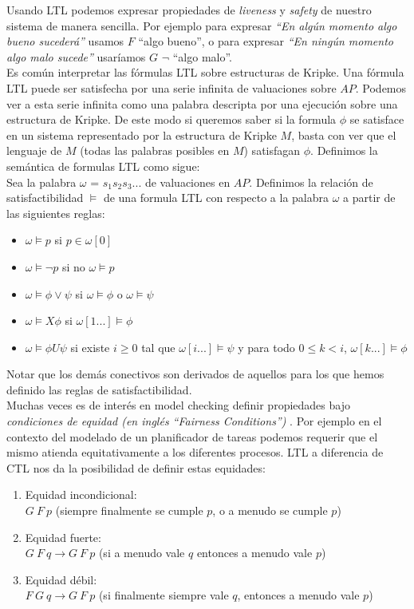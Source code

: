 \documentclass[titlepage, 12pt]{book}
\begin{document}
Usando LTL podemos expresar propiedades de \textit{liveness} y \textit{safety} de nuestro sistema de manera sencilla. Por ejemplo para expresar \textit{``En alg\'un momento algo bueno suceder\'a''} usamos  $F$ ``algo bueno'', o para expresar \textit{``En ning\'un momento algo malo sucede''} usar\'iamos $G$ $\neg$ ``algo malo''.\\

Es com\'un interpretar las f\'ormulas LTL sobre estructuras de Kripke. Una f\'ormula LTL puede ser satisfecha por una serie infinita de valuaciones sobre $AP$. Podemos ver a esta serie infinita como una palabra descripta por una ejecuci\'on sobre una estructura de Kripke. De este modo si queremos saber si la formula $\phi$ se satisface en un sistema representado por la estructura de Kripke $M$, basta con ver que el lenguaje de $M$ (todas las palabras posibles en $M$) satisfagan $\phi$. Definimos la sem\'antica de formulas LTL como sigue:\\

Sea la palabra $\omega$ = $s_1s_2s_3...$ de valuaciones en $AP$. Definimos la relaci\'on de satisfactibilidad $\models$ de una formula LTL con respecto a la palabra $\omega$ a partir de las siguientes reglas:
\begin{itemize}
\item $\omega \models p $ si $ p \in \omega[0]$
\item $\omega \models \neg p $ si no $\omega \models p$
\item $\omega \models \phi \vee \psi$ si $\omega \models \phi$ o $\omega \models \psi$
\item $\omega \models X \phi$ si $\omega[1...] \models \phi$
\item $\omega \models \phi U \psi$ si existe $i \geq 0$ tal que  $\omega[i...] \models \psi$ y para todo $0 \leq k < i$, $\omega[k...] \models \phi$ 
\end{itemize}
Notar que los dem\'as conectivos son derivados de aquellos para los que hemos definido las reglas de satisfactibilidad. \\

Muchas veces es de inter\'es en model checking definir propiedades bajo \textit{condiciones de equidad (en ingl\'es ``Fairness Conditions'')} . Por ejemplo en el contexto del modelado de un planificador de tareas podemos requerir que el mismo atienda equitativamente a los diferentes procesos. LTL a diferencia de CTL nos da la posibilidad de definir estas equidades:

\begin{enumerate}
\item Equidad incondicional:\\[0.3cm] $G~F~p$ (siempre finalmente se cumple $p$, o a menudo se cumple $p$)
\item Equidad fuerte:\\[0.3cm] $G~F~q \rightarrow G~F~p$ (si a menudo vale $q$ entonces a menudo vale $p$)
\item Equidad d\'ebil:\\[0.3cm] $F~G~q \rightarrow G~F~p$ (si finalmente siempre vale $q$, entonces a menudo vale $p$)
\end{enumerate}
\end{document}

